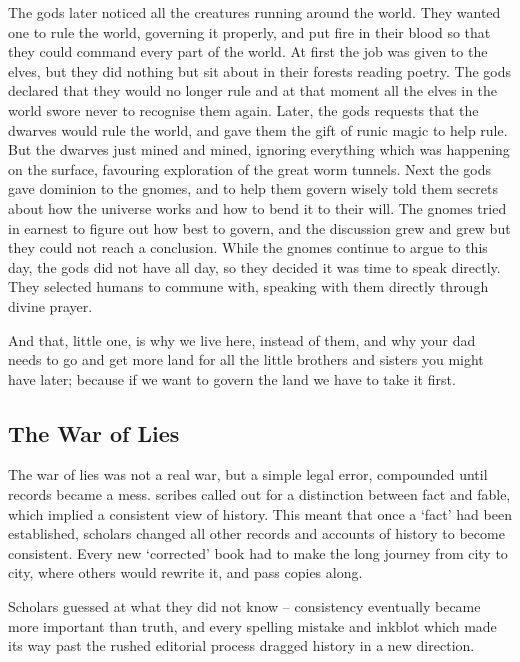 \begin{multicols}{2}
\begin{exampletext}
  The gods later noticed all the creatures running around the world.
  They wanted one to rule the world, governing it properly, and put fire in their blood so that they could command every part of the world.
  At first the job was given to the elves, but they did nothing but sit about in their forests reading poetry.
  The gods declared that they would no longer rule and at that moment all the elves in the world swore never to recognise them again.
  Later, the gods requests that the dwarves would rule the world, and gave them the gift of runic magic to help rule.
  But the dwarves just mined and mined, ignoring everything which was happening on the surface, favouring exploration of the great worm tunnels.
  Next the gods gave dominion to the gnomes, and to help them govern wisely told them secrets about how the universe works and how to bend it to their will.
  The gnomes tried in earnest to figure out how best to govern, and the discussion grew and grew but they could not reach a conclusion.
  While the gnomes continue to argue to this day, the gods did not have all day, so they decided it was time to speak directly.
  They selected humans to commune with, speaking with them directly through divine prayer.

  And that, little one, is why we live here, instead of them, and why your dad needs to go and get more land for all the little brothers and sisters you might have later; because if we want to govern the land we have to take it first.
\fi

\end{exampletext}

\subsection{The War of Lies}
\label{warOfLies}

\begin{exampletext}
  \ifcase\value{r6}\relax\or
    The war of lies was not a real war, but a simple legal error, compounded until records became a mess.
    \Glspl{scribe} called out for a distinction between fact and fable, which implied a consistent view of history.
    This meant that once a `fact' had been established, scholars changed all other records and accounts of history to become consistent.
    Every new `corrected' book had to make the long journey from city to city, where others would rewrite it, and pass copies along.

    Scholars guessed at what they did not know -- consistency eventually became more important than truth, and every spelling mistake and inkblot which made its way past the rushed editorial process dragged history in a new direction.


\end{exampletext}
\end{multicols}
